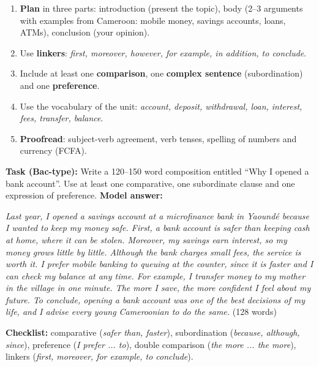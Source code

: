 \documentclass[11pt]{article}
\begin{document}
\begin{methode}
\begin{enumerate}
\item \textbf{Plan} in three parts: introduction (present the topic), body (2--3 arguments with examples from Cameroon: mobile money, savings accounts, loans, ATMs), conclusion (your opinion).
\item Use \textbf{linkers}: \emph{first, moreover, however, for example, in addition, to conclude}.
\item Include at least one \textbf{comparison}, one \textbf{complex sentence} (subordination) and one \textbf{preference}.
\item Use the vocabulary of the unit: \emph{account, deposit, withdrawal, loan, interest, fees, transfer, balance}.
\item \textbf{Proofread}: subject-verb agreement, verb tenses, spelling of numbers and currency (FCFA).
\end{enumerate}
\end{methode}

\begin{exoresolu}
\textbf{Task (Bac-type):} Write a 120--150 word composition entitled ``Why I opened a bank account''. Use at least one comparative, one subordinate clause and one expression of preference.
\tcblower
\textbf{Model answer:}

\emph{Last year, I opened a savings account at a microfinance bank in Yaoundé because I wanted to keep my money safe. First, a bank account is safer than keeping cash at home, where it can be stolen. Moreover, my savings earn interest, so my money grows little by little. Although the bank charges small fees, the service is worth it. I prefer mobile banking to queuing at the counter, since it is faster and I can check my balance at any time. For example, I transfer money to my mother in the village in one minute. The more I save, the more confident I feel about my future. To conclude, opening a bank account was one of the best decisions of my life, and I advise every young Cameroonian to do the same.} (128 words)

\textbf{Checklist:} comparative (\emph{safer than, faster}), subordination (\emph{because, although, since}), preference (\emph{I prefer ... to}), double comparison (\emph{the more ... the more}), linkers (\emph{first, moreover, for example, to conclude}).
\end{exoresolu}
\end{document}
